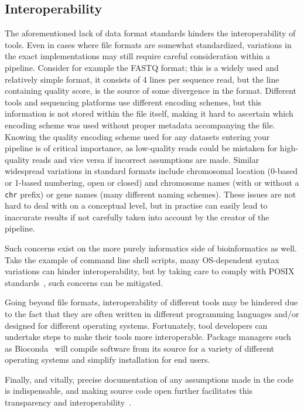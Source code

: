 \begin{justify}
\subsection{Interoperability}

The aforementioned lack of data format standards hinders the interoperability of tools. Even in cases where file formats are somewhat standardized, variations in the exact implementations may still require careful consideration within a pipeline. Consider for example the FASTQ format; this is a widely used and relatively simple format, it consists of 4 lines per sequence read, but the line containing quality score, is the source of some divergence in the format. Different tools and sequencing platforms use different encoding schemes, but this information is not stored within the file itself, making it hard to ascertain which encoding scheme was used without proper metadata accompanying the file. Knowing the quality encoding scheme used for any datasets entering your pipeline is of critical importance, as low-quality reads could be mistaken for high-quality reads and vice versa if incorrect assumptions are made. Similar widespread variations in standard formats include chromosomal location (0-based or 1-based numbering, open or closed) and chromosome names (with or without a \verb+chr+ prefix) or gene names (many different naming schemes). These issues are not hard to deal with on a conceptual level, but in practise can easily lead to inaccurate results if not carefully taken into account by the creator of the pipeline.

Such concerns exist on the more purely informatics side of bioinformatics as well. Take the example of command line shell scripts, many OS-dependent syntax variations can hinder interoperability, but by taking care to comply with POSIX standards~\cite{walli1995posix}, such concerns can be mitigated.

Going beyond file formats, interoperability of different tools may be hindered due to the fact that they are often written in different programming languages and/or designed for different operating systems. Fortunately, tool developers can undertake steps to make their tools more interoperable. Package managers such as Bioconda~\cite{gruning2017bioconda} will compile software from its source for a variety of different operating systems and simplify installation for end users.

Finally, and vitally, precise documentation of any assumptions made in the code is indispensable, and making source code open further facilitates this transparency and interoperability~\cite{ince2012case}.



\end{justify}
